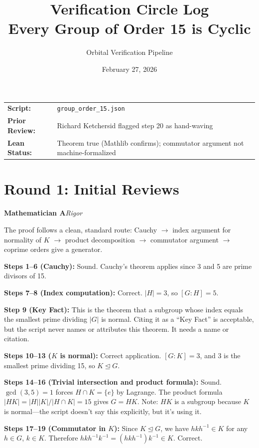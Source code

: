 \documentclass[11pt]{article}
\title{\bfseries Verification Circle Log\\[4pt]
\large Every Group of Order 15 is Cyclic}
\author{Orbital Verification Pipeline}
\date{February 27, 2026}
\newcommand{\agent}[3]{%
  \medskip\noindent
  \textcolor{#1}{\textbf{#2}}\hfill\textcolor{#1}{\textit{#3}}\par\smallskip
}
\begin{document}
\maketitle

\begin{tcolorbox}[colback=gray!5, colframe=gray!50, title={\textbf{Session Info}}]
\begin{tabular}{@{}ll@{}}
\textbf{Script:} & \texttt{group\_order\_15.json} \\
\textbf{Prior Review:} & Richard Ketchersid flagged step 20 as hand-waving \\
\textbf{Lean Status:} & Theorem true (Mathlib confirms); commutator argument not machine-formalized \\
\end{tabular}
\end{tcolorbox}

\section{Round 1: Initial Reviews}

\agent{rigorblue}{Mathematician A}{Rigor}

The proof follows a clean, standard route: Cauchy $\to$ index argument for normality of $K$ $\to$ product decomposition $\to$ commutator argument $\to$ coprime orders give a generator.

\textbf{Steps 1--6 (Cauchy):} Sound. Cauchy's theorem applies since 3 and 5 are prime divisors of 15.

\textbf{Steps 7--8 (Index computation):} Correct. $|H|=3$, so $[G:H]=5$.

\textbf{Step 9 (Key Fact):} This is the theorem that a subgroup whose index equals the smallest prime dividing $|G|$ is normal. Citing it as a ``Key Fact'' is acceptable, but the script never names or attributes this theorem. It needs a name or citation.

\textbf{Steps 10--13 ($K$ is normal):} Correct application. $[G:K]=3$, and 3 is the smallest prime dividing 15, so $K \trianglelefteq G$.

\textbf{Steps 14--16 (Trivial intersection and product formula):} Sound. $\gcd(3,5)=1$ forces $H \cap K = \{e\}$ by Lagrange. The product formula $|HK| = |H||K|/|H\cap K| = 15$ gives $G = HK$. Note: $HK$ is a subgroup because $K$ is normal---the script doesn't say this explicitly, but it's using it.

\textbf{Steps 17--19 (Commutator in $K$):} Since $K \trianglelefteq G$, we have $hkh^{-1} \in K$ for any $h \in G$, $k \in K$. Therefore $hkh^{-1}k^{-1} = (hkh^{-1})k^{-1} \in K$. Correct.
\end{document}
